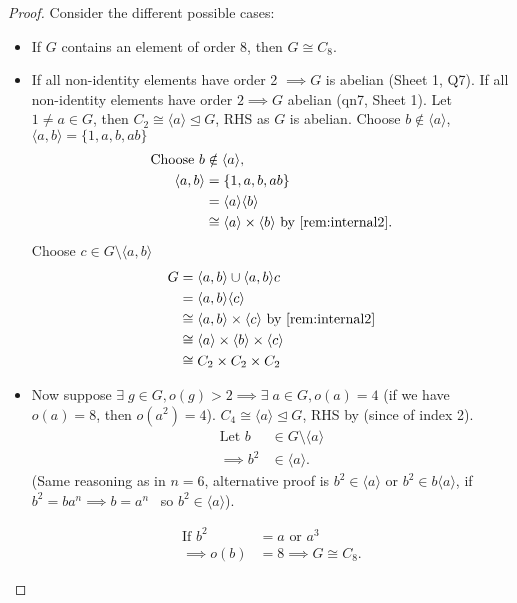 \begin{proof}
  Consider the different possible cases:
  \begin{itemize}
    \item If $G$ contains an element of order 8, then $G\cong C_8$.
    \item If all non-identity elements have order 2 $\implies G$ is abelian (Sheet 1, Q7). 
    If all non-identity elements have order $2 \implies G$ abelian (qn7, Sheet 1).
    Let $1 \neq a \in G$, then $C_2 \cong \langle a \rangle \trianglelefteq G$, RHS as $G$ is abelian.
    Choose $b \notin \langle a \rangle$, $\langle a, b \rangle = \{1, a, b, ab \}$ 
    \begin{align*}
      \text{Choose } b &\notin \langle a \rangle, \\
      \langle a, b \rangle &= \{1, a, b, ab \} \\
      &= \langle a \rangle \langle b \rangle \\
      &\cong \langle a \rangle \times \langle b \rangle \text{ by \Cref{rem:internal2}.}
    \end{align*} 
    Choose $c \in G \setminus \langle a, b \rangle$ 
    \begin{align*}
      G &= \langle a, b \rangle \cup \langle a, b \rangle c \\
      &= \langle a, b \rangle \langle c \rangle \\
      &\cong \langle a, b \rangle \times \langle c \rangle \text{ by \Cref{rem:internal2}}\\
      &\cong \langle a \rangle \times \langle b \rangle \times \langle c \rangle \\
      &\cong C_2 \times C_2 \times C_2
    \end{align*} 
    \item Now suppose $\exists \; g \in G, o(g) > 2 \implies \exists \; a \in G, o(a) = 4$ (if we have $o(a) = 8$, then $o(a^2) = 4$). 
    $C_4 \cong \langle a \rangle \trianglelefteq G$, RHS by  (since of index 2).
    \begin{align*}
      \text{Let } b &\in G \setminus \langle a \rangle \\
      \implies b^2 &\in \langle a \rangle.
    \end{align*} (Same reasoning as in $n = 6$, alternative proof is $b^2 \in \langle a \rangle$ or $b^2 \in b \langle a \rangle$, if $b^2 = b a^n \implies b = a^n$ \Lightning \ so $b^2 \in \langle a \rangle$).
    
    \begin{align*}
      \text{If } b^2 &= a \text{ or } a^3 \\
      \implies o(b) &= 8 \implies G \cong C_8.
    \end{align*}


\end{itemize}
\end{proof}
